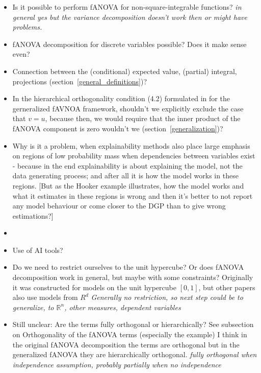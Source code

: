 \begin{itemize}
    \item Is it possible to perform fANOVA for non-square-integrable functions? \textit{in general yes but the variance decomposition doesn't work then or might have problems.}
    \item fANOVA decomposition for discrete variables possible? Does it make sense even?
    \item Connection between the (conditional) expected value, (partial) integral, projections (section~\ref{general_definitions})?
    \item In the hierarchical orthogonality condition (4.2) formulated in \cite{hooker2007} for the gerneralized fAVNOA framework, shouldn't we explicitly exclude the case that $v = u$, because then, we would require that the inner product of the fANOVA component is zero wouldn't we (section~\ref{generalization})?
    \item Why is it a problem, when explainability methods also place large emphasis on regions of low probability mass when dependencies between variables exist - because in the end explainability is about explaining the model, not the data generating process; and after all it is how the model works in these regions. [But as the Hooker example illustrates, how the model works and what it estimates in these regions is wrong and then it's better to not report any model behaviour or come closer to the DGP than to give wrong estimations?]
    \item 
    \item Use of AI tools?
    \item Do we need to restrict ourselves to the unit hypercube? Or does fANOVA decomposition work in general, but maybe with some constraints? Originally it was constructed for models on the unit hypercube $[0,1]$, but other papers also use models from $R^d$ \textit{Generally no restriction, so next step could be to generalize, to $\mathbb{R}^n$, other measures, dependent variables}
    \item Still unclear: Are the terms fully orthogonal or hierarchically? See subsection on Orthogonality of the fANOVA terms (especially the example) I think in the original fANOVA decomposition the terms are orthogonal but in the generalized fANOVA \citep{hooker2007} they are hierarchically orthogonal. \textit{fully orthogonal when independence assumption, probably partially when no independence}

\end{itemize}
